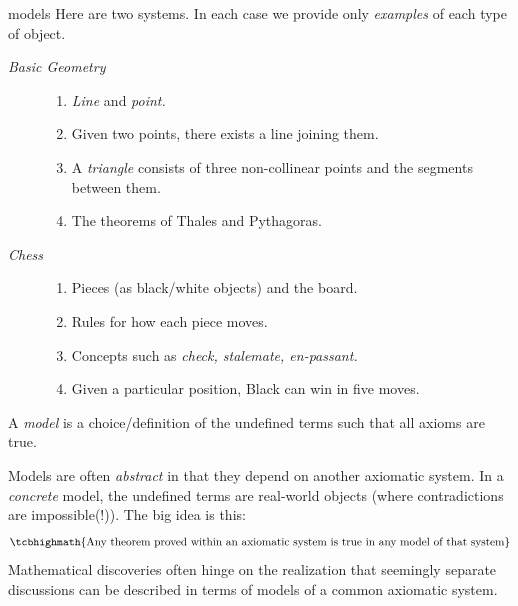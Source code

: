 \begin{examples}{}{models}
	Here are two systems. In each case we provide only \emph{examples} of each type of object.\vspace{-2pt}
	\begin{description}
		\item[\normalfont\emph{Basic Geometry}]\begin{enumerate}\itemsep2pt
		  \item \emph{Line} and \emph{point.}
		  \item Given two points, there exists a line joining them.
		  \item A \emph{triangle} consists of three non-collinear points and the segments between them. 
		  \item The theorems of Thales and Pythagoras.
	  \end{enumerate}
		\item[\normalfont\emph{Chess}]\begin{enumerate}\itemsep2pt
		  \item Pieces (as black/white objects) and the board.
		  \item Rules for how each piece moves.
		  \item Concepts such as \emph{check, stalemate, en-passant.}
		  \item Given a particular position, Black can win in five moves.
	  \end{enumerate}	
	\end{description}
\end{examples}




\begin{defn}{}{}
	A \emph{model} is a choice/definition of the undefined terms such that all axioms are true.
\end{defn}

Models are often \emph{abstract} in that they depend on another axiomatic system. In a \emph{concrete} model, the undefined terms are real-world objects (where contradictions are impossible(!)). The big idea is this:
\[
	\tcbhighmath{
		\text{Any theorem proved within an axiomatic system is true in any model of that system}
	}
\]
Mathematical discoveries often hinge on the realization that seemingly separate discussions can be described in terms of models of a common axiomatic system.

